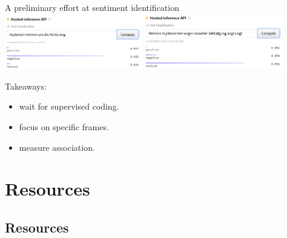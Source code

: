 \documentclass[
  ignorenonframetext,
]{beamer}
\providecommand{\tightlist}{%
  \setlength{\itemsep}{0pt}\setlength{\parskip}{0pt}}
\begin{document}
\begin{frame}[allowframebreaks]{A preliminary effort at sentiment
identification}
\includegraphics[width=0.45\textwidth,height=\textheight]{vis/BERTProbs4.png}
\includegraphics[width=0.45\textwidth,height=\textheight]{vis/BERTProbs5.png}

\framebreak

Takeaways:

\begin{itemize}
\tightlist
\item
  wait for supervised coding.
\item
  focus on specific frames.
\item
  measure association.
\end{itemize}
\end{frame}

\hypertarget{resources}{%
\section{Resources}\label{resources}}

\hypertarget{resources-1}{%
\subsection*{Resources}\label{resources-1}}
\end{document}

